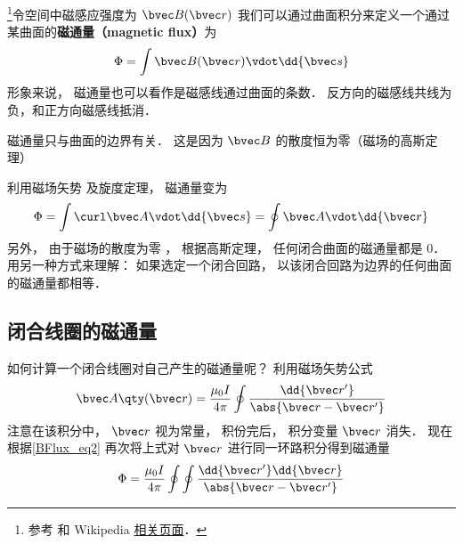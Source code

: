 
\begin{issues}
\issueDraft
{}
\end{issues}


\footnote{参考 \cite{GriffE} 和 Wikipedia \href{https://en.wikipedia.org/wiki/Magnetic_flux}{相关页面}．}令空间中磁感应强度为 $\bvec B(\bvec r)$ 我们可以通过曲面积分来定义一个通过某曲面的\textbf{磁通量（magnetic flux）}为
\begin{equation}
\Phi  = \int \bvec B(\bvec r) \vdot \dd{\bvec s}
\end{equation}
形象来说， 磁通量也可以看作是磁感线通过曲面的条数． 反方向的磁感线共线为负，和正方向磁感线抵消．

磁通量只与曲面的边界有关． 这是因为 $\bvec B$ 的散度恒为零（磁场的高斯定理）


利用磁场矢势%
及旋度定理， %
磁通量变为
\begin{equation} \label{BFlux_eq2}
\Phi  = \int \curl \bvec A \vdot \dd{\bvec s}  = \oint \bvec A \vdot \dd{\bvec r}
\end{equation}
另外， 由于磁场的散度为零%
， 根据高斯定理， 任何闭合曲面的磁通量都是 0． 用另一种方式来理解： 如果选定一个闭合回路， 以该闭合回路为边界的任何曲面的磁通量都相等．

\subsection{闭合线圈的磁通量}

如何计算一个闭合线圈对自己产生的磁通量呢？ 利用磁场矢势公式
\begin{equation}
\bvec A \qty(\bvec r) = \frac{\mu_0 I}{4 \pi} \oint \frac{\dd{\bvec r'}}{\abs{\bvec r - \bvec r'}}
\end{equation}
注意在该积分中， $\bvec r$ 视为常量， 积份完后， 积分变量 $\bvec r$ 消失． 现在根据\autoref{BFlux_eq2} 再次将上式对 $\bvec r$ 进行同一环路积分得到磁通量
\begin{equation}
\Phi  = \frac{\mu_0 I}{4\pi} \oint\oint \frac{\dd{\bvec r'} \dd{\bvec r}}{\abs{\bvec r - \bvec r'}}
\end{equation}
